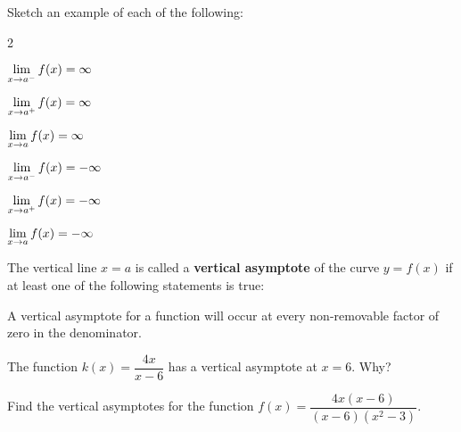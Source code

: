 \documentclass[notes]{subfiles}
\begin{document}
		\begin{ex}
			Sketch an example of each of the following:\\[5pt]
			\begin{minipage}{\textwidth}
				\begin{enumerate}[(a)]
				\setlength\itemsep{2in}
				\end{enumerate}
			\end{minipage}
		\end{ex}
			\vs{1}
		
			
		\begin{defn}
			The vertical line \(x = a\) is called a \textbf{vertical asymptote} of the curve \(y = f(x)\) if at least one of the following statements is true:\\[75pt]
		\end{defn}
			\newpage
			
		\begin{rmk}
			A vertical asymptote for a function will occur at every non-removable factor of zero in the denominator.
		\end{rmk}
		
		\begin{ex}
			The function \(k(x) = \dfrac{4x}{x-6}\) has a vertical asymptote at \(x = 6\). Why?
		\end{ex}
			
		\begin{ex}
			Find the vertical asymptotes for the function \(f(x) = \dfrac{4x(x-6)}{(x-6)(x^2-3)}\).
		\end{ex}
			\vs{1}
			\newpage
				
\end{document}

